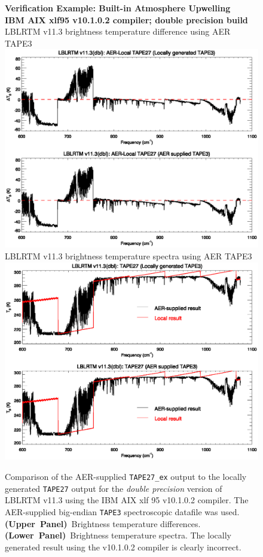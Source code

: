 \begin{figure}[htp]
  \centering
  \qquad\sffamily\textbf{Verification Example: Built-in Atmosphere Upwelling}\\
  \qquad\sffamily\textbf{IBM AIX xlf95 v10.1.0.2 compiler; double precision build}\\
  \qquad\textsf{LBLRTM v11.3 brightness temperature difference using AER TAPE3}\\
  \includegraphics[bb=80 403 534 558,clip,scale=1.0]{graphics/run_example_user_defined_upwelling/ibm/dbl-busted-dt.eps}
  \qquad\textsf{LBLRTM v11.3 brightness temperature spectra using AER TAPE3}\\
  \includegraphics[bb=80 403 534 558,clip,scale=1.0]{graphics/run_example_user_defined_upwelling/ibm/dbl-busted-t.eps}
  \caption{Comparison of the AER-supplied \texttt{TAPE27\_ex} output to the locally generated \texttt{TAPE27} output for the \textsl{double precision} version of LBLRTM v11.3 using the IBM AIX xlf 95 v10.1.0.2 compiler. The AER-supplied big-endian \texttt{TAPE3} spectroscopic datafile was used. \mbox{\textbf{(Upper Panel)} Brightness} temperature differences. \mbox{\textbf{(Lower Panel)} Brightness} temperature spectra. The locally generated result using the v10.1.0.2 compiler is clearly incorrect.}
  \label{fig:run_example_user_defined_atm_upwelling-dbl-ibm_busted}
\end{figure}

